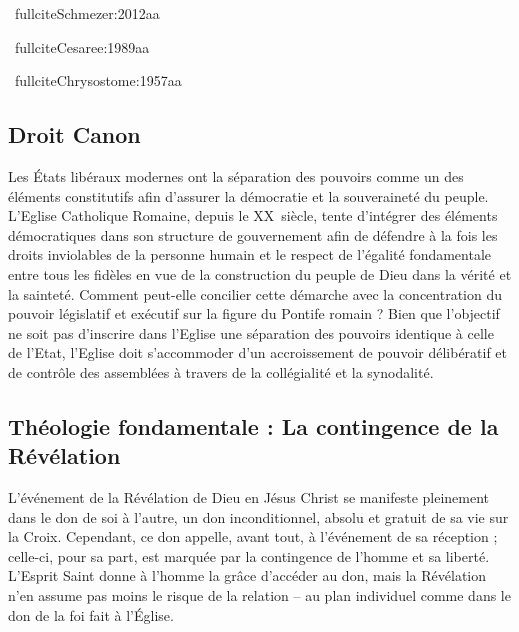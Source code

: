 \begin{references}
\ fullcite{Schmezer:2012aa}

\ fullcite{Cesaree:1989aa}

\ fullcite{Chrysostome:1957aa}
\end{references}
\subsection{Droit Canon}

Les États libéraux modernes ont la séparation des pouvoirs comme un des éléments constitutifs afin d’assurer la démocratie et la souveraineté du peuple. L’Eglise Catholique Romaine, depuis le XX\ieme~siècle, tente d’intégrer des éléments démocratiques dans son structure de gouvernement afin de défendre à la fois les droits inviolables de la personne humain et le respect de l’égalité fondamentale entre tous les fidèles en vue de la construction du peuple de Dieu dans la vérité et la sainteté. Comment peut-elle concilier cette démarche avec la concentration du pouvoir législatif et exécutif sur la figure du Pontife romain ? Bien que l’objectif ne soit pas d’inscrire dans l’Eglise une séparation des pouvoirs identique à celle de l’Etat, l’Eglise doit s’accommoder d’un accroissement de pouvoir délibératif et de contrôle des assemblées à travers de la collégialité et la synodalité. \\

\begin{references}

\end{references}
\subsection{Théologie fondamentale : La contingence de la Révélation}


L'événement de la Révélation de Dieu en Jésus Christ se manifeste pleinement dans le don de soi à l'autre, un don inconditionnel, absolu et gratuit de sa vie sur la Croix. Cependant, ce don appelle, avant tout, à l'événement de sa réception ; celle-ci, pour sa part, est marquée par la contingence de l'homme et sa liberté. L'Esprit Saint donne à l'homme la grâce d'accéder au don, mais la Révélation n'en assume pas moins le risque de la relation – au plan individuel comme dans le don de la foi fait à l’Église.\\

\begin{references}



\end{references}



